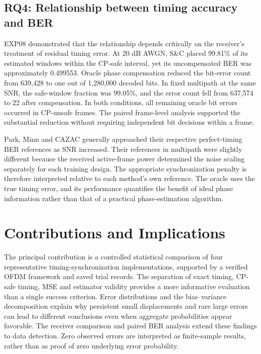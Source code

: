 \subsection*{RQ4: Relationship between timing accuracy and BER}

EXP08 demonstrated that the relationship depends critically on the receiver's
treatment of residual timing error. At 20 dB AWGN, S\&C placed 99.81\%
of its estimated windows within the CP-safe interval, yet its uncompensated
BER was approximately 0.499553. Oracle phase compensation reduced the
bit-error count from 639,428 to one out of 1,280,000 decoded bits. In
fixed multipath at the same SNR, the safe-window fraction was 99.05\%,
and the error count fell from 637,574 to 22 after compensation. In both
conditions, all remaining oracle bit errors occurred in CP-unsafe frames.
The paired frame-level analysis supported the substantial reduction without
requiring independent bit decisions within a frame.

Park, Minn and CAZAC generally approached their respective perfect-timing
BER references as SNR increased. Their references in multipath were
slightly different because the received active-frame power determined the
noise scaling separately for each training design. The appropriate
synchronization penalty is therefore interpreted relative to each method's
own reference. The oracle uses the true timing error, and its performance
quantifies the benefit of ideal phase information rather than that of a
practical phase-estimation algorithm.

\section{Contributions and Implications}

The principal contribution is a controlled statistical comparison of four
representative timing-synchronization implementations, supported by a
verified OFDM framework and saved trial records.
The separation of exact timing, CP-safe timing, MSE and estimator
validity provides a more informative evaluation than a single success
criterion. Error distributions and the bias--variance decomposition explain
why persistent small displacements and rare large errors can lead to
different conclusions even when aggregate probabilities appear favorable.
The receiver comparison and paired BER analysis extend these findings to
data detection. Zero observed errors are interpreted as finite-sample
results, rather than as proof of zero underlying error probability.

